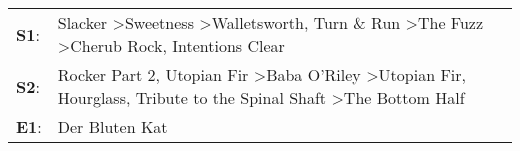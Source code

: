\begin{supertabular}{p{0.03\textwidth}p{0.92\textwidth}}
 \textbf{S1}:  &              Slacker\textsuperscript{} \textgreater \enspace Sweetness\textsuperscript{} \textgreater \enspace Walletsworth\textsuperscript{}, \enspace Turn \& Run\textsuperscript{} \textgreater \enspace The Fuzz\textsuperscript{} \textgreater \enspace Cherub Rock\textsuperscript{}, \enspace Intentions Clear\textsuperscript{}  \enspace  \\
 \textbf{S2}:  &  Rocker Part 2\textsuperscript{}, \enspace Utopian Fir\textsuperscript{} \textgreater \enspace Baba O'Riley\textsuperscript{} \textgreater \enspace Utopian Fir\textsuperscript{}, \enspace Hourglass\textsuperscript{}, \enspace Tribute to the Spinal Shaft\textsuperscript{} \textgreater \enspace The Bottom Half\textsuperscript{}  \enspace  \\
 \textbf{E1}:  &                                                                                                                                                                                                                                                                                                        Der Bluten Kat\textsuperscript{}  \enspace  \\
\end{supertabular}
